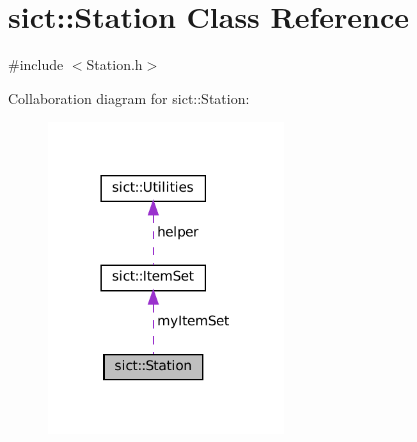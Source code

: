 \hypertarget{classsict_1_1Station}{}\section{sict\+::Station Class Reference}
\label{classsict_1_1Station}


{\ttfamily \#include $<$Station.\+h$>$}



Collaboration diagram for sict\+::Station\+:
\nopagebreak
\begin{figure}[H]
\begin{center}
\leavevmode
\includegraphics[width=177pt]{classsict_1_1Station__coll__graph}
\end{center}
\end{figure}

